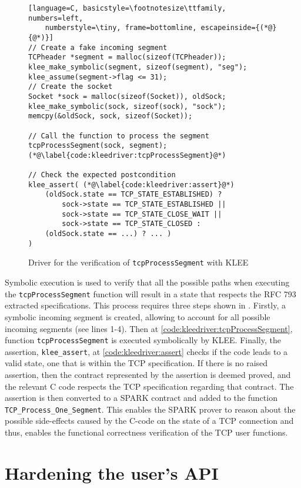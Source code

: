 \documentclass[conference]{IEEEtran}
\def\spark#1{\lstinline[language=Ada]{#1}}
\begin{document}
\begin{figure}
\begin{lstlisting}[language=C, basicstyle=\footnotesize\ttfamily, numbers=left,
    numberstyle=\tiny, frame=bottomline, escapeinside={(*@}{@*)}]
// Create a fake incoming segment
TCPheader *segment = malloc(sizeof(TCPheader));
klee_make_symbolic(segment, sizeof(segment), "seg");
klee_assume(segment->flag <= 31);
// Create the socket
Socket *sock = malloc(sizeof(Socket)), oldSock;
klee_make_symbolic(sock, sizeof(sock), "sock");
memcpy(&oldSock, sock, sizeof(Socket));

// Call the function to process the segment
tcpProcessSegment(sock, segment); (*@\label{code:kleedriver:tcpProcessSegment}@*)

// Check the expected postcondition
klee_assert( (*@\label{code:kleedriver:assert}@*)
    (oldSock.state == TCP_STATE_ESTABLISHED) ?
        sock->state == TCP_STATE_ESTABLISHED ||
        sock->state == TCP_STATE_CLOSE_WAIT ||
        sock->state == TCP_STATE_CLOSED :
    (oldSock.state == ...) ? ... )
)
\end{lstlisting}
\caption{Driver for the verification of \lstinline[language=C]{tcpProcessSegment}
with KLEE}
\label{code:kleedriver}
\end{figure}

Symbolic execution is used to verify that all the possible paths when executing the \spark{tcpProcessSegment} function will result in a state that respects the RFC 793 extracted specifications. This process requires three steps shown in . Firstly, a symbolic incoming segment is created, allowing to account for all possible incoming segments (see lines 1-4). Then at \cref{code:kleedriver:tcpProcessSegment}, function \texttt{tcpProcessSegment} is executed symbolically by KLEE. Finally, the assertion, \texttt{klee\_assert}, at \cref{code:kleedriver:assert} checks if the code leads to a valid state, one that is within the TCP specification. If there is no raised assertion, then the contract represented by the assertion is deemed proved, and the relevant C code respects the TCP specification regarding that contract. The assertion is then converted to a SPARK contract and added to the function \spark{TCP_Process_One_Segment}. This enables the SPARK prover to reason about the possible side-effects caused by the C-code on the state of a TCP connection and thus, enables the functional correctness verification of the TCP user functions.

\section{Hardening the user's API}
\label{sec:API}
\end{document}

